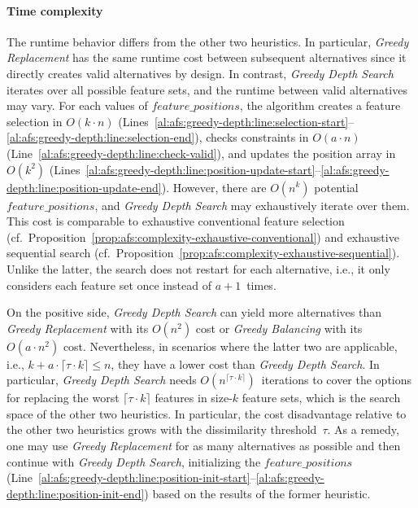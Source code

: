 \documentclass{article}
\theoremstyle{definition}
\begin{document}
\paragraph{Time complexity}

The runtime behavior differs from the other two heuristics.
In particular, \emph{Greedy Replacement} has the same runtime cost between subsequent alternatives since it directly creates valid alternatives by design.
In contrast, \emph{Greedy Depth Search} iterates over all possible feature sets, and the runtime between valid alternatives may vary.
For each values of $\mathit{feature\_positions}$, the algorithm creates a feature selection in $O(k \cdot n)$ (Lines~\ref{al:afs:greedy-depth:line:selection-start}--\ref{al:afs:greedy-depth:line:selection-end}), checks constraints in $O(a \cdot n)$ (Line~\ref{al:afs:greedy-depth:line:check-valid}), and updates the position array in~$O(k^2)$ (Lines~\ref{al:afs:greedy-depth:line:position-update-start}--\ref{al:afs:greedy-depth:line:position-update-end}).
However, there are $O(n^k)$ potential $\mathit{feature\_positions}$, and \emph{Greedy Depth Search} may exhaustively iterate over them.
This cost is comparable to exhaustive conventional feature selection (cf.~Proposition~\ref{prop:afs:complexity-exhaustive-conventional}) and exhaustive sequential search (cf.~Proposition~\ref{prop:afs:complexity-exhaustive-sequential}).
Unlike the latter, the search does not restart for each alternative, i.e., it only considers each feature set once instead of $a+1$~times.

On the positive side, \emph{Greedy Depth Search} can yield more alternatives than \emph{Greedy Replacement} with its $O(n^2)$ cost or \emph{Greedy Balancing} with its $O(a \cdot n^2)$ cost.
Nevertheless, in scenarios where the latter two are applicable, i.e., $k + a \cdot \lceil \tau \cdot k \rceil \leq n$, they have a lower cost than \emph{Greedy Depth Search}.
In particular, \emph{Greedy Depth Search} needs $O(n^{\lceil \tau \cdot k \rceil})$~iterations to cover the options for replacing the worst $\lceil \tau \cdot k \rceil$ features in size-$k$ feature sets, which is the search space of the other two heuristics.
In particular, the cost disadvantage relative to the other two heuristics grows with the dissimilarity threshold~$\tau$.
As a remedy, one may use \emph{Greedy Replacement} for as many alternatives as possible and then continue with \emph{Greedy Depth Search}, initializing the $\mathit{feature\_positions}$ (Line~\ref{al:afs:greedy-depth:line:position-init-start}--\ref{al:afs:greedy-depth:line:position-init-end}) based on the results of the former heuristic.
\end{document}
